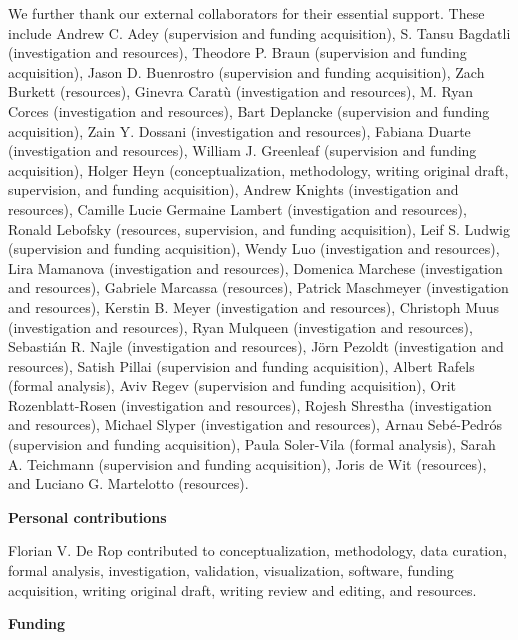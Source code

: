 We further thank our external collaborators for their essential support. These include
Andrew C. Adey (supervision and funding acquisition),
S. Tansu Bagdatli (investigation and resources),
Theodore P. Braun (supervision and funding acquisition),
Jason D. Buenrostro (supervision and funding acquisition),
Zach Burkett (resources),
Ginevra Caratù (investigation and resources),
M. Ryan Corces (investigation and resources),
Bart Deplancke (supervision and funding acquisition),
Zain Y. Dossani (investigation and resources),
Fabiana Duarte (investigation and resources),
William J. Greenleaf (supervision and funding acquisition),
Holger Heyn (conceptualization, methodology, writing original draft, supervision, and funding acquisition),
Andrew Knights (investigation and resources),
Camille Lucie Germaine Lambert (investigation and resources),
Ronald Lebofsky (resources, supervision, and funding acquisition),
Leif S. Ludwig (supervision and funding acquisition),
Wendy Luo (investigation and resources),
Lira Mamanova (investigation and resources),
Domenica Marchese (investigation and resources),
Gabriele Marcassa (resources),
Patrick Maschmeyer (investigation and resources),
Kerstin B. Meyer (investigation and resources),
Christoph Muus (investigation and resources),
Ryan Mulqueen (investigation and resources),
Sebastián R. Najle (investigation and resources),
Jörn Pezoldt (investigation and resources),
Satish Pillai (supervision and funding acquisition),
Albert Rafels (formal analysis),
Aviv Regev (supervision and funding acquisition),
Orit Rozenblatt-Rosen (investigation and resources),
Rojesh Shrestha (investigation and resources),
Michael Slyper (investigation and resources),
Arnau Sebé-Pedrós (supervision and funding acquisition),
Paula Soler-Vila (formal analysis),
Sarah A. Teichmann (supervision and funding acquisition),
Joris de Wit (resources),
and Luciano G. Martelotto (resources).

\vspace{1em}
\noindent\textbf{\Large Personal contributions}\par
\vspace{0.5em}
Florian V. De Rop contributed to conceptualization, methodology, data curation, formal analysis, investigation, validation, visualization, software, funding acquisition, writing original draft, writing review and editing, and resources.

\vspace{1em}
\noindent\textbf{\Large Funding}\par
\vspace{0.5em}


